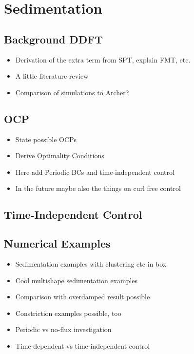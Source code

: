 \documentclass[11pt, a4paper]{article}
\theoremstyle{definition}
\begin{document}
    \section{Sedimentation}
    
	\subsection{Background DDFT}
		\begin{itemize}
			\item Derivation of the extra term from SPT, explain FMT, etc. 
			\item A little literature review
			\item Comparison of simulations to Archer?
		\end{itemize}
	
	
	\subsection{OCP}
		\begin{itemize}
			\item State possible OCPs
			\item Derive Optimality Conditions
			\item Here add Periodic BCs and time-independent control
			\item In the future maybe also the things on curl free control
		\end{itemize}
	
	
	\subsection{Time-Independent Control}
	
	
	\subsection{Numerical Examples}
		\begin{itemize}
			\item Sedimentation examples with clustering etc in box
			\item Cool multishape sedimentation examples
			\item Comparison with overdamped result possible
			\item Constriction examples possible, too
			\item Periodic vs no-flux investigation
			\item Time-dependent vs time-independent control 
		\end{itemize}
	
	
	
\end{document}
